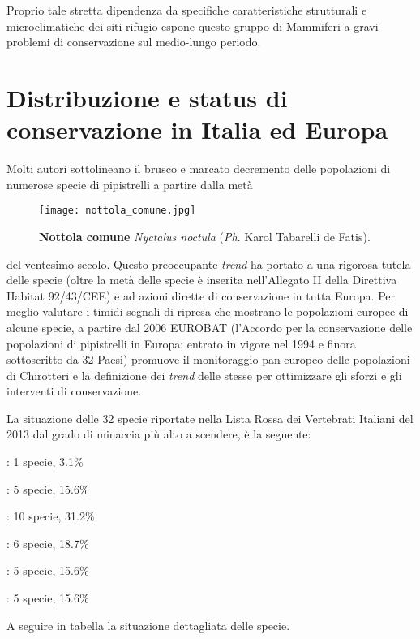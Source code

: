 \documentclass[10pt,twoside,openany,x11names,svgnames,italian,a5paper,dvipsnames,table]{memoir}
\newcommand{\ph}{\emph{Ph}. }
\begin{document}
Proprio tale stretta dipendenza da specifiche caratteristiche strutturali e microclimatiche dei siti rifugio espone questo gruppo di Mammiferi a gravi problemi di conservazione sul medio-lungo periodo.

\newpage
\section{Distribuzione e status di conservazione in Italia ed Europa}
Molti autori \cite{Dietz} \cite{Kunz} \cite{Lanza} \cite{Rondinini} sottolineano il brusco e marcato decremento delle popolazioni
di numerose specie di pipistrelli a partire dalla metà
\begin{wrapfigure}[15]{l}{.6\columnwidth}
\centering
  \texttt{[image: nottola\_comune.jpg]}
  \caption*{ \textbf{Nottola comune} \emph{Nyctalus noctula} (\ph Karol Tabarelli de Fatis).}
\end{wrapfigure}
 del ventesimo secolo. 
Questo preoccupante \emph{trend} ha portato a una rigorosa tutela delle specie (oltre la metà delle specie è inserita nell’Allegato II della Direttiva Habitat 92/43/CEE) e ad azioni dirette di conservazione in tutta Europa. Per meglio valutare i timidi segnali di ripresa che mostrano le popolazioni europee di alcune specie, a partire dal 2006 EUROBAT (l’Accordo per la conservazione delle popolazioni di pipistrelli in Europa; entrato in vigore nel 1994 e finora sottoscritto da 32 Paesi) promuove il monitoraggio pan-europeo delle popolazioni di Chirotteri e la definizione dei \emph{trend} delle stesse per ottimizzare gli sforzi e gli interventi di conservazione.

La situazione delle 32 specie riportate nella Lista Rossa dei Vertebrati Italiani del 2013 dal grado di minaccia più alto a scendere, è la seguente:

\footnotesize
\begin{description}\itemsep0pt
  \item [In pericolo critico (CR)]: 1 specie, 3.1\% 
  \item [In pericolo (EN)]: 5 specie, 15.6\% 
  \item [Vulnerabile (VU)]: 10 specie, 31.2\% 
  \item [Quasi minacciata (NT)]: 6 specie, 18.7\% 
  \item [Minor preoccupazione (LC)]: 5 specie, 15.6\% 
  \item [Dati insufficienti (DD)]: 5 specie, 15.6\%
\end{description}
\normalsize
\newline A seguire in tabella la situazione dettagliata delle specie.
\end{document}
